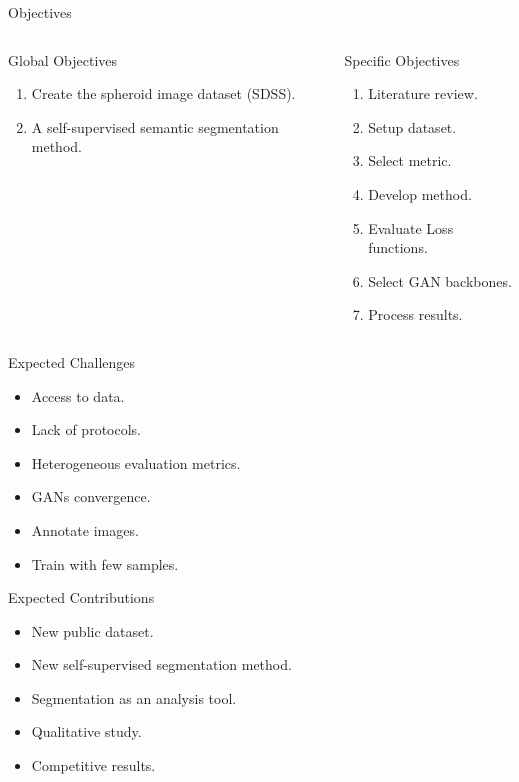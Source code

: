 \begin{frame}{Objectives}
    \begin{columns}
            \begin{block}{Global Objectives}
                \begin{enumerate}
                    \item Create the spheroid image dataset (SDSS).
                    \item A self-supervised semantic segmentation method.
                \end{enumerate}
            \end{block}
            \begin{block}{Specific Objectives}
                \begin{enumerate}
                    \item Literature review.
                    \item Setup dataset.
                    \item Select metric.
                    \item Develop method.
                    \item Evaluate Loss functions.
                    \item Select GAN backbones.
                    \item Process results.
                \end{enumerate}
            \end{block}
    \end{columns}
\end{frame}


\begin{frame}{Expected Challenges}
    \begin{itemize}
        \item Access to data.
        \item Lack of protocols.
        \item Heterogeneous evaluation metrics.
        \item GANs convergence.
        \item Annotate images.
        \item Train with few samples.
    \end{itemize}
\end{frame}

\begin{frame}{Expected Contributions}
    \begin{itemize}
        \item New public dataset.
        \item New self-supervised segmentation method.
        \item Segmentation as an analysis tool.
        \item Qualitative study.
        \item Competitive results.
    \end{itemize}
\end{frame}
